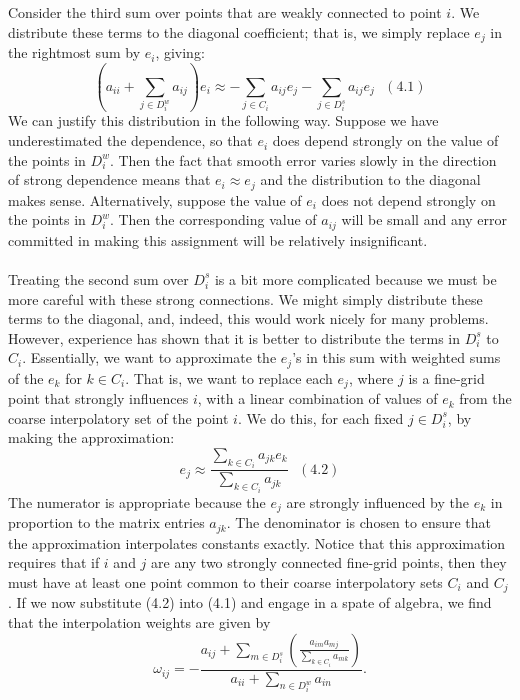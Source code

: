 \documentclass[11pt]{book}
\begin{document}
Consider the third sum over points that are weakly connected to point $i$. We distribute these terms to the diagonal coefficient; that is, we simply replace $e_{j}$ in the rightmost sum by $e_{i}$, giving:
$$
\left(a_{i i}+\sum_{j \in D_{i}^{w}} a_{i j}\right) e_{i} \approx-\sum_{j \in C_{i}} a_{i j} e_{j}-\sum_{j \in D_{i}^{s}} a_{i j} e_{j} \ \ \ (4.1)
$$
We can justify this distribution in the following way. Suppose we have underestimated the dependence, so that $e_{i}$ does depend strongly on the value of the points in $D_{i}^{w}$. Then the fact that smooth error varies slowly in the direction of strong dependence means that $e_{i} \approx e_{j}$ and the distribution to the diagonal makes sense. Alternatively, suppose the value of $e_{i}$ does not depend strongly on the points in $D_{i}^{w}$. Then the corresponding value of $a_{i j}$ will be small and any error committed in making this assignment will be relatively insignificant.\\ \\
Treating the second sum over $D_{i}^{s}$ is a bit more complicated because we must be more careful with these strong connections. We might simply distribute these terms to the diagonal, and, indeed, this would work nicely for many problems. However, experience has shown that it is better to distribute the terms in $D_{i}^{s}$ to $C_{i}$. Essentially, we want to approximate the $e_{j}$'s in this sum with weighted sums of the $e_{k}$ for $k \in C_{i}$. That is, we want to replace each $e_{j}$, where $j$ is a fine-grid point that strongly influences $i$, with a linear combination of values of $e_{k}$ from the coarse interpolatory set of the point $i$. We do this, for each fixed $j \in D_{i}^{s}$, by making the approximation:
$$
e_{j} \approx \frac{\sum_{k \in C_{i}} a_{j k} e_{k}}{\sum_{k \in C_{i}} a_{j k}} \ \  \ (4.2)
$$
The numerator is appropriate because the $e_{j}$ are strongly influenced by the $e_{k}$ in proportion to the matrix entries $a_{j k}$. The denominator is chosen to ensure that the approximation interpolates constants exactly. Notice that this approximation requires that if $i$ and $j$ are any two strongly connected fine-grid points, then they must have at least one point common to their coarse interpolatory sets $C_{i}$ and $C_{j}$.
If we now substitute (4.2) into (4.1) and engage in a spate of algebra, we find that the interpolation weights are given by
$$
\omega_{i j}=-\frac{a_{i j}+\sum_{m \in D_{i}^{s}}\left(\frac{a_{i m} a_{m j}}{\sum_{k \in C_{i}} a_{m k}}\right)}{a_{i i}+\sum_{n \in D_{i}^{w}} a_{i n}} .
$$
\end{document}
